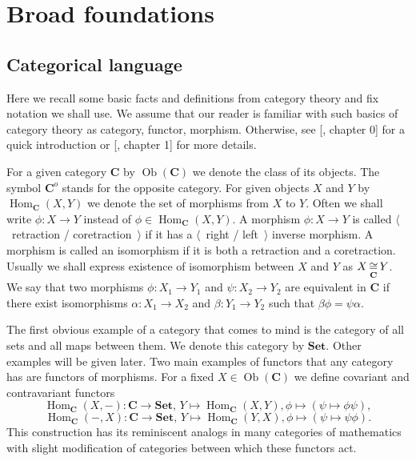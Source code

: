 
\section{
  Broad foundations}\label{SectionBroadFoundations} 


\subsection{
  Categorical language}\label{SubSectionCategoricalLanguage}

Here we recall some basic facts and definitions from category theory and fix
notation we shall use. We assume that our reader is familiar with such basics of
category theory as category, functor, morphism. Otherwise, see
[\cite{HelLectAndExOnFuncAn}, chapter 0] for a quick introduction or
[\cite{KashivShapCatsAndSheavs}, chapter 1] for more details.

For a given category $\mathbf{C}$ by $\operatorname{Ob}(\mathbf{C})$ we denote
the class of its objects. The symbol $\mathbf{C}^o$ stands for the opposite
category. For given objects $X$ and $Y$ by 
$\operatorname{Hom}_{\mathbf{C}}(X, Y)$ 
we denote the set of morphisms from $X$ to $Y$. Often we shall write
$\phi:X\to Y$ instead of $\phi\in\operatorname{Hom}_{\mathbf{C}}(X,Y)$. A
morphism $\phi:X\to Y$ is called $\langle$~retraction / coretraction~$\rangle$
if it has a $\langle$~right / left~$\rangle$ inverse morphism. A morphism 
is called an isomorphism if it is both a retraction and a coretraction. Usually we shall
express existence of isomorphism between $X$ and $Y$ as $X\mathop{\mathbin{\cong}}\limits_{\mathbf{C}} Y$.
We say that two morphisms $\phi:X_1\to Y_1$ and $\psi:X_2\to Y_2$ are equivalent
in $\mathbf{C}$ if there exist isomorphisms $\alpha:X_1\to X_2$ and
$\beta:Y_1\to Y_2$ such that $\beta\phi=\psi\alpha$.

The first obvious example of a category that comes to mind is the category of
all sets and all maps between them. We denote this category by $\mathbf{Set}$.
Other examples will be given later. Two main examples of functors that any
category has are functors of morphisms. For a fixed
$X\in\operatorname{Ob}(\mathbf{C})$ we define covariant and contravariant
functors
$$
\operatorname{Hom}_{\mathbf{C}}(X,-)
:\mathbf{C}\to\mathbf{Set},\,
Y\mapsto \operatorname{Hom}_{\mathbf{C}}(X,Y), 
\phi\mapsto(\psi\mapsto \phi\psi),
$$
$$
\operatorname{Hom}_{\mathbf{C}}(-,X)
:\mathbf{C}\to\mathbf{Set},\,
Y\mapsto \operatorname{Hom}_{\mathbf{C}}(Y,X), 
\phi\mapsto(\psi\mapsto \psi\phi).
$$
This construction has its reminiscent analogs in many categories of mathematics
with slight modification of categories between which these functors act.

